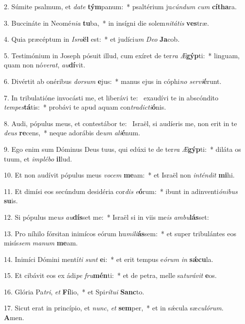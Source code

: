 2. Súmite psalmum, et \textit{da}\textit{te} \textbf{tým}panum:~*  psaltérium ju\textit{cún}\textit{dum} \textit{cum} \textbf{cí}\textbf{tha}ra.\

3. Buccináte in Neomé\textit{ni}\textit{a} \textbf{tu}ba,~*  in insígni die solem\textit{ni}\textit{tá}\textit{tis} \textbf{ves}træ.\

4. Quia præcéptum in \textit{Is}\textit{ra}\textbf{ël} est:~*  et judíci\textit{um} \textit{De}\textit{o} \textbf{Ja}cob.\

5. Testimónium in Joseph pósuit illud, cum exíret de ter\textit{ra} \textit{Æ}\textbf{gýp}ti:~*  linguam, quam non nó\textit{ve}\textit{rat}, \textit{au}\textbf{dí}vit.\

6. Divértit ab onéribus \textit{dor}\textit{sum} \textbf{e}jus:~*  manus ejus in cóphi\textit{no} \textit{ser}\textit{vi}\textbf{é}runt.\

7. In tribulatióne invocásti me, et liberávi te: \dag\  exaudívi te in abscóndito \textit{tem}\textit{pes}\textbf{tá}tis:~*  probávi te apud aquam con\textit{tra}\textit{dic}\textit{ti}\textbf{ó}nis.\

8. Audi, pópulus meus, et contestábor te: \dag\  Israël, si audíeris me, non erit in te \textit{de}\textit{us} \textbf{re}cens,~*  neque adorábis de\textit{um} \textit{a}\textit{li}\textbf{é}num.\

9. Ego enim sum Dóminus Deus tuus, qui edúxi te de ter\textit{ra} \textit{Æ}\textbf{gýp}ti:~*  diláta os tuum, et \textit{im}\textit{plé}\textit{bo} \textbf{il}lud.\

10. Et non audívit pópulus meus \textit{vo}\textit{cem} \textbf{me}am:~*  et Israël non \textit{in}\textit{tén}\textit{dit} \textbf{mi}hi.\

11. Et dimísi eos secúndum desidéria cor\textit{dis} \textit{e}\textbf{ó}rum:~*  ibunt in adinventi\textit{ó}\textit{ni}\textit{bus} \textbf{su}is.\

12. Si pópulus me\textit{us} \textit{au}\textbf{dís}set me:~*  Israël si in viis me\textit{is} \textit{am}\textit{bu}\textbf{lás}set:\

13. Pro níhilo fórsitan inimícos eórum hu\textit{mi}\textit{li}\textbf{ás}sem:~*  et super tribulántes eos misís\textit{sem} \textit{ma}\textit{num} \textbf{me}am.\

14. Inimíci Dómini mentí\textit{ti} \textit{sunt} \textbf{e}i:~*  et erit tempus e\textit{ó}\textit{rum} \textit{in} \textbf{sǽ}\textbf{cu}la.\

15. Et cibávit eos ex ádi\textit{pe} \textit{fru}\textbf{mén}ti:~*  et de petra, melle sa\textit{tu}\textit{rá}\textit{vit} \textbf{e}os.\

16. Glória Pa\textit{tri}, \textit{et} \textbf{Fí}lio,~*  et Spi\textit{rí}\textit{tu}\textit{i} \textbf{Sanc}to.\

17. Sicut erat in princípio, et \textit{nunc}, \textit{et} \textbf{sem}per,~*  et in sǽcula sæ\textit{cu}\textit{ló}\textit{rum}. \textbf{A}men.\

